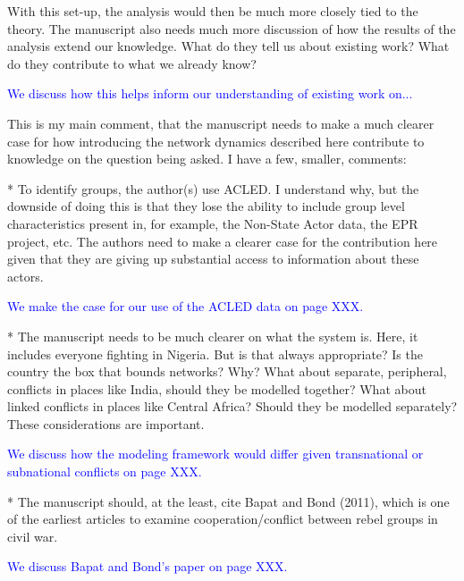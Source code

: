 \documentclass[12pt,onesided,fullpage]{amsart}
\begin{document}
With this set-up, the analysis would then be much more closely tied to the theory. The manuscript also needs much more discussion of how the results of the analysis extend our knowledge. What do they tell us about existing work? What do they contribute to what we already know?

\textcolor{blue}{We discuss how this helps inform our understanding of existing work on...}

This is my main comment, that the manuscript needs to make a much clearer case for how introducing the network dynamics described here contribute to knowledge on the question being asked. I have a few, smaller, comments:

*       To identify groups, the author(s) use ACLED. I understand why, but the downside of doing this is that they lose the ability to include group level characteristics present in, for example, the Non-State Actor data, the EPR project, etc. The authors need to make a clearer case for the contribution here given that they are giving up substantial access to information about these actors.

\textcolor{blue}{We make the case for our use of the ACLED data on page XXX.}

*       The manuscript needs to be much clearer on what the system is. Here, it includes everyone fighting in Nigeria. But is that always appropriate? Is the country the box that bounds networks? Why? What about separate, peripheral, conflicts in places like India, should they be modelled together? What about linked conflicts in places like Central Africa? Should they be modelled separately? These considerations are important.

\textcolor{blue}{We discuss how the modeling framework would differ given transnational or subnational conflicts on page XXX.}

*       The manuscript should, at the least, cite Bapat and Bond (2011), which is one of the earliest articles to examine cooperation/conflict between rebel groups in civil war.

\textcolor{blue}{We discuss Bapat and Bond's paper on page XXX.}
\end{document}
